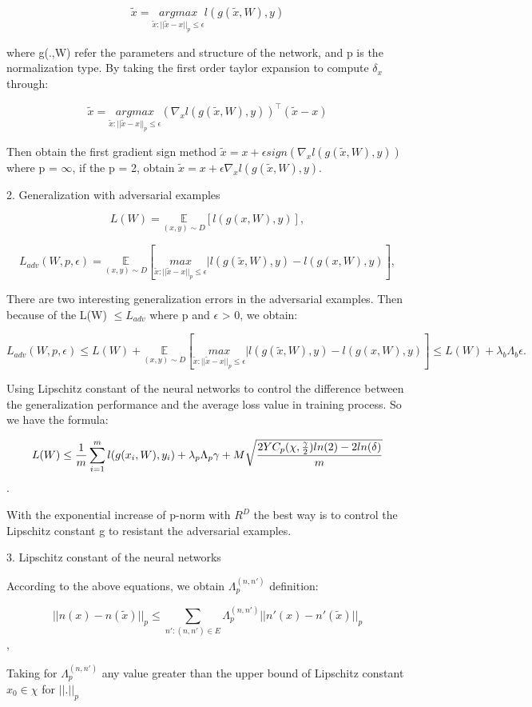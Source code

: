 $$\tilde{x} = \underset{\tilde{x}:||\tilde{x}-x||_p \leq \epsilon}{argmax} l(g(\tilde{x},W),y)$$

where g(.,W) refer the parameters and structure of the network, and p is the normalization type. By taking the first order taylor expansion to compute $\delta_x$ through: 

$$\tilde{x} = \underset{\tilde{x}:||\tilde{x}-x||_p \leq \epsilon}{argmax} (\nabla_x l(g(\tilde{x},W),y))^\top(\tilde{x}-x)$$

Then obtain the first gradient sign method $\tilde{x} = x + \epsilon sign(\nabla_x l(g(\tilde{x},W),y))$ where p = $\infty$, if the p = 2, obtain $\tilde{x} = x + \epsilon \nabla_x l(g(\tilde{x},W),y)$.


2. Generalization with adversarial examples

$$L(W) = \underset{(x,y)\sim D}{\mathbb{E}} [l(g(x, W),y)],$$

$$L_{adv}(W,p,\epsilon) = \underset{(x,y)\sim D}{\mathbb{E}} [\underset{\tilde{x}:||\tilde{x}-x||_p \leq \epsilon}{max} | l(g(\tilde{x}, W),y) - l(g(x, W),y)],$$

There are two interesting generalization errors in the adversarial examples. Then because of the L(W) $\leq L_{adv}$ where p and $\epsilon$ > 0, we obtain:

$$L_{adv}(W,p,\epsilon) \leq L(W) + \underset{(x,y)\sim D}{\mathbb{E}} [\underset{\tilde{x}:||\tilde{x}-x||_p \leq \epsilon}{max} | l(g(\tilde{x}, W),y) - l(g(x, W),y)] \leq L(W) + \lambda_b \Lambda_b \epsilon.$$

Using Lipschitz constant of the neural networks to control the difference between the generalization performance and the average loss value in training process. So we have the formula:

$$ L(W) \leq {1 \over m} \sum_{i=1}^{m} l(g(x_i,W),y_i) + \lambda_p\Lambda_p\gamma + M \sqrt{{2YC_p(\chi, {\gamma \over 2})ln(2) - 2ln(\delta)}\over m}$$.

With the exponential increase of p-norm with $R^D$ the best way is to control the Lipschitz constant g to resistant the adversarial examples.

3. Lipschitz constant of the neural networks

According to the above equations, we obtain $\Lambda_p^{(n,n')}$ definition:

$$||n(x)-n(\tilde{x})||_p \leq \sum_{n':(n,n')\in E} \Lambda_p^{(n,n')}||n'(x) - n'(\tilde{x})||_p$$,

Taking for $\Lambda_p^{(n,n')}$ any value greater than the upper bound of Lipschitz constant $x_0 \in \chi$ for $||.||_p$ 

